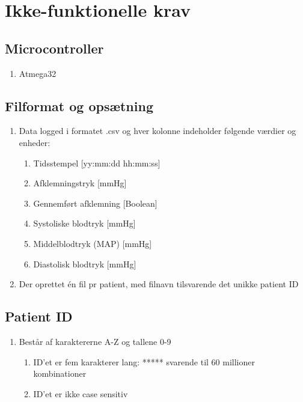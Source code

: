 	\chapter{Ikke-funktionelle krav }
	
	\section{Microcontroller}
	\begin{enumerate}
		\setlength\itemsep{0cm}
		\item Atmega32
		\end{enumerate}
	
	\section{Filformat og opsætning}
	\begin{enumerate}
		\setlength\itemsep{0cm} %
		\item Data logged i formatet .csv og hver kolonne indeholder følgende værdier og enheder: 
		\begin{enumerate}
			\item Tidsstempel [yy:mm:dd hh:mm:ss]
			\item Afklemningstryk [mmHg]
			\item Gennemført afklemning [Boolean]
			\item Systoliske blodtryk [mmHg]
			\item Middelblodtryk (MAP) [mmHg]
			\item Diastolisk blodtryk [mmHg]
		\end{enumerate}
		\item Der oprettet én fil pr patient, med filnavn tilsvarende det unikke patient ID
	\end{enumerate}
	
	\section{Patient ID}
	\begin{enumerate}
		\setlength\itemsep{0cm} %
		\item Består af karaktererne A-Z og tallene 0-9
		\begin{enumerate}
			\item ID’et er fem karakterer lang: ***** svarende til 60 millioner kombinationer
			\item ID’et er ikke case sensitiv
		\end{enumerate}
	\end{enumerate}
	
